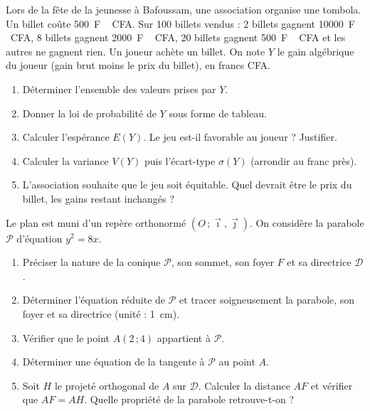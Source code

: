 \documentclass[11pt]{article}
\begin{document}
\begin{exercice}
Lors de la fête de la jeunesse à Bafoussam, une association organise une tombola. Un billet coûte \SI{500}{F\,CFA}. Sur 100 billets vendus : 2 billets gagnent \SI{10000}{F\,CFA}, 8 billets gagnent \SI{2000}{F\,CFA}, 20 billets gagnent \SI{500}{F\,CFA} et les autres ne gagnent rien. Un joueur achète un billet. On note $Y$ le gain algébrique du joueur (gain brut moins le prix du billet), en francs CFA.
\begin{enumerate}
\item Déterminer l'ensemble des valeurs prises par $Y$.
\item Donner la loi de probabilité de $Y$ sous forme de tableau.
\item Calculer l'espérance $E(Y)$. Le jeu est-il favorable au joueur ? Justifier.
\item Calculer la variance $V(Y)$ puis l'écart-type $\sigma(Y)$ (arrondir au franc près).
\item L'association souhaite que le jeu soit équitable. Quel devrait être le prix du billet, les gains restant inchangés ?
\end{enumerate}
\end{exercice}

\begin{exercice}
Le plan est muni d'un repère orthonormé $(O\,;\vec{\imath},\vec{\jmath})$. On considère la parabole $\mathcal{P}$ d'équation $y^2 = 8x$.
\begin{enumerate}
\item Préciser la nature de la conique $\mathcal{P}$, son sommet, son foyer $F$ et sa directrice $\mathcal{D}$.
\item Déterminer l'équation réduite de $\mathcal{P}$ et tracer soigneusement la parabole, son foyer et sa directrice (unité : \SI{1}{cm}).
\item Vérifier que le point $A(2\,;4)$ appartient à $\mathcal{P}$.
\item Déterminer une équation de la tangente à $\mathcal{P}$ au point $A$.
\item Soit $H$ le projeté orthogonal de $A$ sur $\mathcal{D}$. Calculer la distance $AF$ et vérifier que $AF = AH$. Quelle propriété de la parabole retrouve-t-on ?
\end{enumerate}
\end{exercice}
\end{document}
